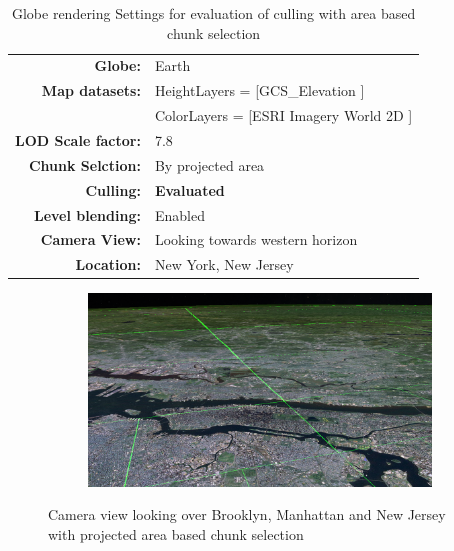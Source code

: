 \begin{table}[h]
  \centering
  \caption[]{Globe rendering Settings for evaluation of culling with area based chunk selection}
  \label{table:cullingasettings}
  \begin{tabular}{| r l |}
    \hline
      \textbf{Globe:}             & Earth \\
      \textbf{Map datasets:}      & HeightLayers = [GCS\_Elevation \cite{worldelevation3d}] \\
                                  & ColorLayers = [ESRI Imagery World 2D \cite{imageryworld2d}] \\
      \textbf{LOD Scale factor:}  & 7.8 \\
      \textbf{Chunk Selction:}    & By projected area \\
      \textbf{Culling:}           & \textbf{Evaluated} \\
      \textbf{Level blending:}    & Enabled \\
      \textbf{Camera View:}       & Looking towards western horizon\\
      \textbf{Location:}          & New York, New Jersey\\
    \hline
  \end{tabular}
\end{table}

\begin{figure}[h]
    \centering
    \begin{subfigure}[bt]{1.0\textwidth}
        \includegraphics[width=\textwidth]{figures/results/culling/cam_a.png}
    \end{subfigure}
    \caption{Camera view looking over Brooklyn, Manhattan and New Jersey with projected area based chunk selection}
    \label{fig:cullingacam}
\end{figure}

